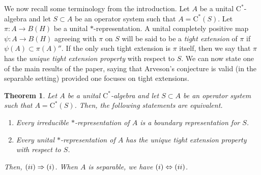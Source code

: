 \documentclass[10pt]{amsart}
\newcommand{\rC}{\mathrm{C}}
\newtheorem{theorem}[lemma]{Theorem}
\theoremstyle{definition}
\begin{document}
We now recall some terminology from the introduction. 
Let $A$ be a unital $\rC^*$-algebra and let $S\subset A$ be an operator system such that $A=\rC^*(S)$. 
Let $\pi:A\to B(H)$ be a unital $*$-representation. A unital completely positive map $\psi:A\to B(H)$ agreeing with $\pi$ on $S$  will be said to be a \emph{tight extension} of $\pi$ if $\psi(A)\subset \pi(A)''$. If the only such tight extension is $\pi$ itself, then we say that $\pi$ has the \emph{unique tight extension property} with respect to $S$. We can now state one of the main results of the paper, saying that Arveson's conjecture is valid (in the separable setting) provided one focuses on tight extensions.

\begin{theorem}\label{T:tightHR}
Let $A$ be a  unital $\rC^*$-algebra and let $S\subset A$ be an operator system such that $A=\rC^*(S)$. Then, the following statements are equivalent.
\begin{enumerate}[{\rm (i)}]
\item Every irreducible $*$-representation of $A$ is a boundary representation for $S$. 
\item Every unital $*$-representation of $A$ has the unique tight extension property with respect to $S$.
\end{enumerate}
Then, ${\rm (ii)}\Rightarrow {\rm (i)}$. When $A$ is separable, we have ${\rm (i)}\Leftrightarrow {\rm (ii)}$.
\end{theorem}
\end{document}
